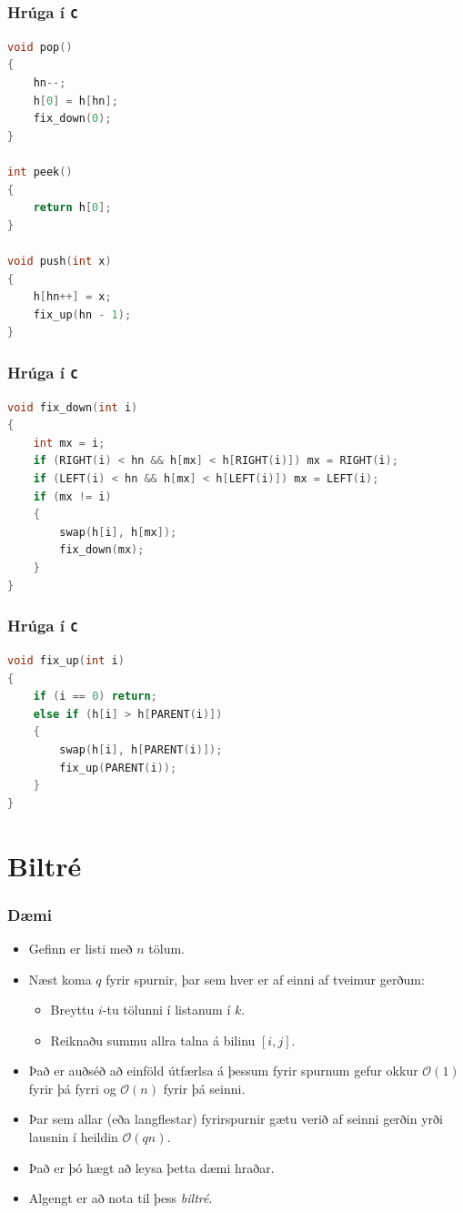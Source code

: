 \documentclass{beamer}
\begin{document}
\begin{frame}[fragile]
	\frametitle{Hrúga í \texttt{C}}
	\tiny
	\begin{lstlisting}[language=C]
void pop()
{
	hn--;
	h[0] = h[hn];
	fix_down(0);
}

int peek()
{
	return h[0];
}

void push(int x)
{
	h[hn++] = x;
	fix_up(hn - 1);
}
\end{lstlisting}
\end{frame}

\begin{frame}[fragile]
	\frametitle{Hrúga í \texttt{C}}
	\tiny
	\begin{lstlisting}[language=C]
void fix_down(int i)
{
	int mx = i;
	if (RIGHT(i) < hn && h[mx] < h[RIGHT(i)]) mx = RIGHT(i);
	if (LEFT(i) < hn && h[mx] < h[LEFT(i)]) mx = LEFT(i);
	if (mx != i)
	{
		swap(h[i], h[mx]);
		fix_down(mx);
	}
}
\end{lstlisting}
\end{frame}

\begin{frame}[fragile]
	\frametitle{Hrúga í \texttt{C}}
	\tiny
	\begin{lstlisting}[language=C]
void fix_up(int i)
{
	if (i == 0) return;
	else if (h[i] > h[PARENT(i)])
	{
		swap(h[i], h[PARENT(i)]);
		fix_up(PARENT(i));
	}
}
\end{lstlisting}
\end{frame}

\section[Biltré]{Biltré}

\begin{frame}
\frametitle{Dæmi}
\begin{itemize}
\item<1-> Gefinn er listi með $n$ tölum.
\item<2-> Næst koma $q$ fyrir spurnir, þar sem hver er af einni af tveimur gerðum:
	\begin{itemize}
	\item<3-> Breyttu $i$-tu tölunni í listanum í $k$.
	\item<4-> Reiknaðu summu allra talna á bilinu $[i, j]$.
	\end{itemize}
\item<5-> Það er auðséð að einföld útfærlsa á þessum fyrir spurnum gefur okkur $\mathcal{O}(1)$ fyrir þá fyrri og $\mathcal{O}(n)$ fyrir þá seinni.
\item<6-> Þar sem allar (eða langflestar) fyrirspurnir gætu verið af seinni gerðin yrði lausnin í heildin $\mathcal{O}(qn)$.
\item<7-> Það er þó hægt að leysa þetta dæmi hraðar.
\item<8-> Algengt er að nota til þess \emph{biltré}.
\end{itemize}
\end{frame}
\end{document}
